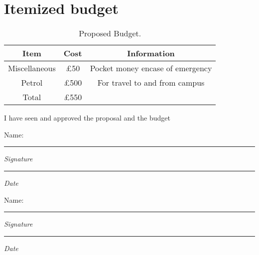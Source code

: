 \documentclass[11pt]{article}
\begin{document}
\def\Task#1#2#3#4{%
\node[task number] at ($(Header.west) + (0, -#1)$) {#1};
\node[task description] at (0,-#1) {#2};
\begin{scope}[shift=($(Header.south east)$)]
  \draw (0,-#1) rectangle +(\totalmonths, 1);
  \foreach \x in {1,...,\totalmonths}
    \draw[help lines] (\x,-#1) -- +(0,1);
  \filldraw[gantt bar] ($(#3, -#1+0.2)$) rectangle +(#4,0.6);
\end{scope}
}

\thispagestyle{empty}


\section{Itemized budget}
\begin{table}[h!]
\begin{center}
\begin{tabular}{||c c c ||} 
 \hline
 Item & Cost & Information \\ [0.5ex] 
 \hline\hline
 Miscellaneous & £50 & Pocket money encase of emergency  \\
 Petrol & £500 & For travel to and from campus\\
 Total & £550 & \\ [1ex] 
 \hline
\end{tabular}
\end{center}
\caption{Proposed Budget.}
\label{table:1}
\end{table}

\printbibliography

I have seen and approved the proposal and the budget\\
	
\newcommand{\namesigdate}[2][5cm]{%
	\begin{minipage}{#1}
		#2 \vspace{1.0cm}\hrule\smallskip
		\small \textit{Signature}
		\vspace{1.0cm}\hrule\smallskip
		\small \textit{Date}
	\end{minipage}
}

\noindent \namesigdate{Name:} \hfill \namesigdate[5cm]{Name:}
\end{document}
